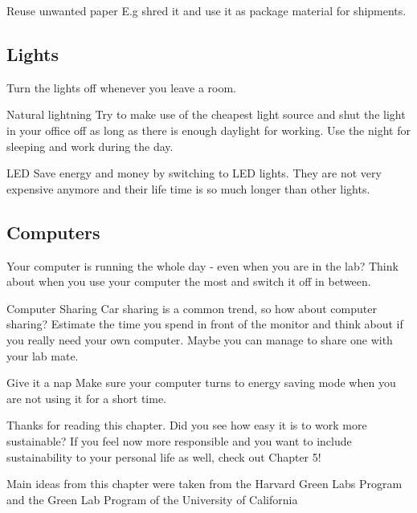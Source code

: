 \begin{suggest}{Reuse unwanted paper}
	E.g shred it and use it as package material for shipments. 
\end{suggest} 

\subsection{Lights}
	Turn the lights off whenever you leave a room. 
	
\begin{suggest}{Natural lightning}
	Try to make use of the cheapest light source and shut the light in your office off as long as there is enough daylight for working. Use the night for sleeping and work during the day. 
\end{suggest} 

\begin{suggest}{LED}
		 Save energy and money by switching to LED lights. They are not very expensive anymore and their life time is so much longer than other lights.
\end{suggest}

\subsection{Computers}
	Your computer is running the whole day - even when you are in the lab? 
	Think about when you use your computer the most and switch it off in between.

\begin{suggest}{Computer Sharing}
	Car sharing is a common trend, so how about computer sharing? 
	Estimate the time you spend in front of the monitor and think about if you really need your own computer. Maybe you can manage to share one with your lab mate. 
\end{suggest}

\begin{suggest}{Give it a nap}
	Make sure your computer turns to energy saving mode when you are not using it for a short time. 
\end{suggest}


Thanks for reading this chapter. Did you see how easy it is to work more sustainable? 
If you feel now more responsible and you want to include sustainability to your personal life as well, check out Chapter 5!  %

Main ideas from this chapter were taken from the Harvard Green Labs Program \cite{GreenHarvard} and the Green Lab Program of the University of California \cite{Greenlab}